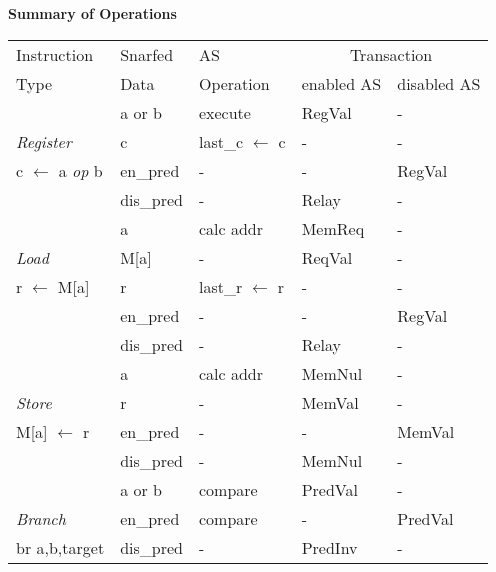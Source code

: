 \documentclass[12pt]{slides}
\begin{document}
\begin{slide}
\begin{center}
\textbf {Summary of Operations}
\end{center}
%



\begin{center}
\tiny{
\begin{tabular}{|l|l||l|l|l|}
\hline Instruction & Snarfed & AS &
\multicolumn{2}{c|}{Transaction}\\ \cline{4-5}
Type & Data & Operation & enabled AS & disabled AS \\
\hline

 & a or b & execute & RegVal & - \\
 \emph{Register} & c & last\_c $\leftarrow$ c & - & -\\
 c $\leftarrow$ a \emph{op} b & en\_pred & - & - & RegVal \\
 & dis\_pred & - & Relay & - \\

 \hline

 & a & calc addr & MemReq & - \\
 \emph{Load} & M[a] & - & ReqVal & - \\
 r $\leftarrow$ M[a] & r & last\_r $\leftarrow$ r & - & -\\
 & en\_pred & - & - & RegVal \\
 & dis\_pred & - & Relay & - \\

 \hline

 & a & calc addr & MemNul & - \\
 \emph{Store} & r & - & MemVal & - \\
 M[a] $\leftarrow$ r & en\_pred & - & - & MemVal \\
 & dis\_pred & - & MemNul & - \\

 \hline

 & a or b & compare & PredVal & - \\
 \emph{Branch} & en\_pred & compare & - & PredVal \\
 br a,b,target & dis\_pred & - & PredInv & - \\

\hline
\end{tabular}
}
\end{center}
%

\end{slide}
\end{document}
